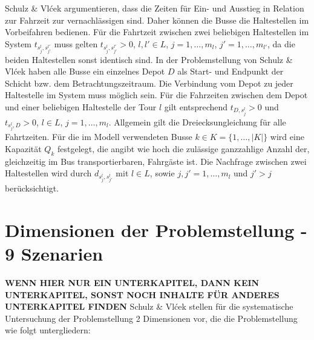Schulz \& Vlćek argumentieren, dass die Zeiten für Ein- und Ausstieg in Relation zur Fahrzeit zur vernachlässigen sind. Daher können die Busse die Haltestellen im Vorbeifahren bedienen.
Für die Fahrtzeit zwischen zwei beliebigen Haltestellen im System $t_{s^l_j, s^{l'}_{j'}}$ muss gelten $t_{s^l_j, s^{l'}_{j'}}> 0$, $l, l' \in L$, $j = 1, \dots, m_l$, $j' = 1, \dots, m_{l'}$, da die beiden Haltestellen sonst identisch sind.
In der Problemstellung von Schulz \& Vlćek haben alle Busse ein einzelnes Depot $D$ als Start- und Endpunkt der Schicht bzw. dem Betrachtungszeitraum. Die Verbindung vom Depot zu jeder Haltestelle im System muss möglich sein. Für die Fahrzeiten zwischen dem Depot und einer beliebigen Haltestelle der Tour $l$ gilt entsprechend $t_{D, s^l_j} > 0$ und $t_{s^l_j, D} > 0$, $l \in L$, $j = 1, \dots, m_l$. Allgemein gilt die Dreiecksungleichung für alle Fahrtzeiten.
Für die im Modell verwendeten Busse $k \in K = \{1, \dots, |K|\}$ wird eine Kapazität $Q_k$ festgelegt, die angibt wie hoch die zulässige ganzzahlige Anzahl der, gleichzeitig im Bus transportierbaren, Fahrgäste ist.
Die Nachfrage zwischen zwei Haltestellen wird durch $d_{s^l_j, s^l_{j'}}$ mit $l \in L$, sowie $j, j' = 1, \dots, m_l$ und $j' > j$ berücksichtigt.


\section{Dimensionen der Problemstellung - 9 Szenarien}
\textbf{WENN HIER NUR EIN UNTERKAPITEL, DANN KEIN UNTERKAPITEL, SONST NOCH INHALTE FÜR ANDERES UNTERKAPITEL FINDEN}
Schulz \& Vlćek stellen für die systematische Untersuchung der Problemstellung 2 Dimensionen vor, die die Problemstellung wie folgt untergliedern:


